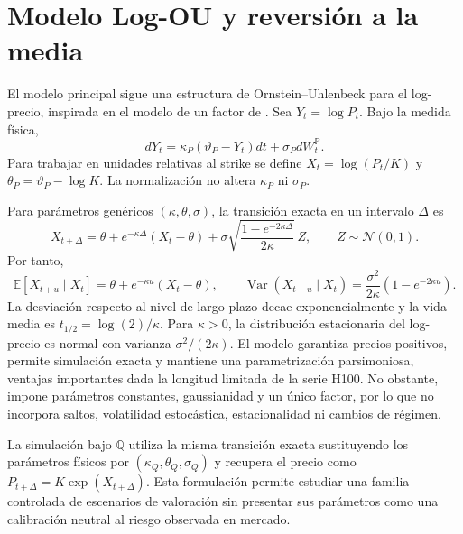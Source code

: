 \section{Modelo Log-OU y reversión a la media}
\label{sec:logou}

El modelo principal sigue una estructura de Ornstein--Uhlenbeck para el
log-precio, inspirada en el modelo de un factor de \textcite{schwartz_1997}. Sea
$Y_t=\log P_t$. Bajo la medida física,
\begin{equation}
    dY_t=\kappa_P(\vartheta_P-Y_t)dt+\sigma_PdW_t^{\mathbb P}.
    \label{eq:logou_physical_unscaled}
\end{equation}
Para trabajar en unidades relativas al strike se define
$X_t=\log(P_t/K)$ y $\theta_P=\vartheta_P-\log K$. La normalización no altera
$\kappa_P$ ni $\sigma_P$.

Para parámetros genéricos $(\kappa,\theta,\sigma)$, la transición exacta en un
intervalo $\Delta$ es
\begin{equation}
    X_{t+\Delta}=\theta+e^{-\kappa\Delta}(X_t-\theta)
    +\sigma\sqrt{\frac{1-e^{-2\kappa\Delta}}{2\kappa}}\,Z,
    \qquad Z\sim\mathcal N(0,1).
    \label{eq:logou_exact_transition}
\end{equation}
Por tanto,
\begin{equation}
    \mathbb E[X_{t+u}\mid X_t]
    =\theta+e^{-\kappa u}(X_t-\theta),
    \qquad
    \operatorname{Var}(X_{t+u}\mid X_t)
    =\frac{\sigma^2}{2\kappa}(1-e^{-2\kappa u}).
    \label{eq:logou_conditional_mean}
\end{equation}
La desviación respecto al nivel de largo plazo decae exponencialmente y la vida
media es $t_{1/2}=\log(2)/\kappa$. Para $\kappa>0$, la distribución estacionaria
del log-precio es normal con varianza $\sigma^2/(2\kappa)$. El modelo garantiza
precios positivos, permite simulación exacta y mantiene una parametrización
parsimoniosa, ventajas importantes dada la longitud limitada de la serie H100.
No obstante, impone parámetros constantes, gaussianidad y un único factor, por
lo que no incorpora saltos, volatilidad estocástica, estacionalidad ni cambios
de régimen.

La simulación bajo $\mathbb Q$ utiliza la misma transición exacta sustituyendo
los parámetros físicos por $(\kappa_Q,\theta_Q,\sigma_Q)$ y recupera el precio
como $P_{t+\Delta}=K\exp(X_{t+\Delta})$. Esta formulación permite estudiar una
familia controlada de escenarios de valoración sin presentar sus parámetros
como una calibración neutral al riesgo observada en mercado.


